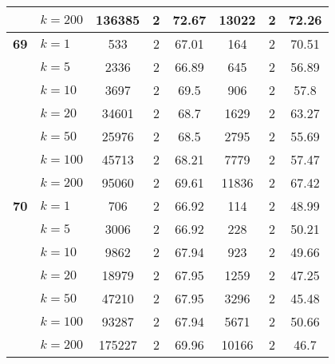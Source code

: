 \begin{table}[htbp]
\begin{tabular}{|l|l|c|c|c|c|c|c|}
     & $k=200$ & 136385 & 2 & 72.67 & 13022 & 2 & 72.26 \\ \hline
    \multicolumn{1}{|r|}{\textbf{69}} & $k=1$ & 533 & 2 & 67.01 & 164 & 2 & 70.51 \\ 
     & $k=5$ & 2336 & 2 & 66.89 & 645 & 2 & 56.89 \\ 
     & $k=10$ & 3697 & 2 & 69.5 & 906 & 2 & 57.8 \\ 
     & $k=20$ & 34601 & 2 & 68.7 & 1629 & 2 & 63.27 \\ 
     & $k=50$ & 25976 & 2 & 68.5 & 2795 & 2 & 55.69 \\ 
     & $k=100$ & 45713 & 2 & 68.21 & 7779 & 2 & 57.47 \\ 
     & $k=200$ & 95060 & 2 & 69.61 & 11836 & 2 & 67.42 \\ \hline
    \multicolumn{1}{|r|}{\textbf{70}} & $k=1$ & 706 & 2 & 66.92 & 114 & 2 & 48.99 \\ 
     & $k=5$ & 3006 & 2 & 66.92 & 228 & 2 & 50.21 \\ 
     & $k=10$ & 9862 & 2 & 67.94 & 923 & 2 & 49.66 \\ 
     & $k=20$ & 18979 & 2 & 67.95 & 1259 & 2 & 47.25 \\ 
     & $k=50$ & 47210 & 2 & 67.95 & 3296 & 2 & 45.48 \\ 
     & $k=100$ & 93287 & 2 & 67.94 & 5671 & 2 & 50.66 \\ 
     & $k=200$ & 175227 & 2 & 69.96 & 10166 & 2 & 46.7 \\ \hline
    \end{tabular}
\end{table}
